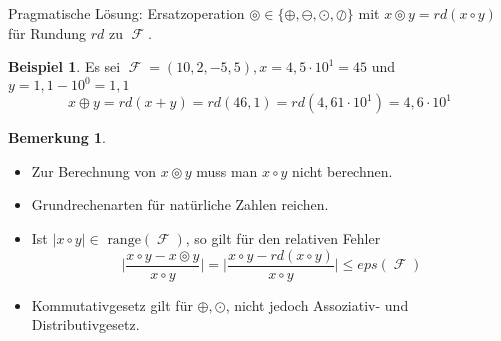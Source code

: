 \documentclass[a4paper,12pt]{article}
\DeclareMathOperator{\F}{\mathcal{F}}
\theoremstyle{definition}
\newtheorem*{example}{Beispiel}
\newtheorem*{bemerkung}{Bemerkung}
\begin{document}
	Pragmatische Lösung: Ersatzoperation $\circledcirc \in \{\oplus, \ominus, \odot, \oslash\}$ mit $x \circledcirc y = rd(x \circ y)$ für Rundung $rd$ zu $\F$.
	\begin{example}
		Es sei $\F = (10,2,-5,5), x = 4,5 \cdot 10^1 = 45$ und $y = 1,1-10^0 = 1,1$
		\[
			x \oplus y = rd(x + y) = rd(46,1) = rd(4,61 \cdot 10^1) = 4,6 \cdot 10^1
		\]
	\end{example}
	\begin{bemerkung}
		\begin{itemize}
			\item Zur Berechnung von $x \circledcirc y$ muss man $x \circ y$ nicht berechnen.
			\item Grundrechenarten für natürliche Zahlen reichen.
			\item Ist $\lvert x \circ y \rvert \in \text{ range}(\F)$, so gilt für den relativen Fehler
			\[
			\Big\lvert \frac{x \circ y - x \circledcirc y}{x \circ y}\Big\rvert = \Big\lvert \frac{x \circ y - rd(x \circ y)}{x \circ y}\Big\rvert \leq eps(\F)
			\]
			\item Kommutativgesetz gilt für $\oplus, \odot$, nicht jedoch Assoziativ- und Distributivgesetz.
		\end{itemize}
	\end{bemerkung}
\end{document}
